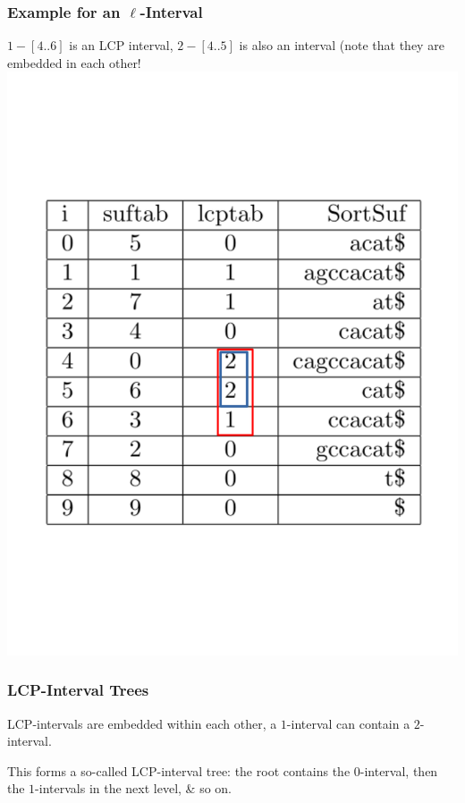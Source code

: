 \documentclass[compress,handout]{beamer} %
\begin{document}
\begin{frame}
	\frametitle{Example for an $\ell$-Interval}
	$1-[4..6]$ is an LCP interval, $2-[4..5]$ is also an interval
	(note that they are embedded in each other!
	\includegraphics[width=\textwidth, height=\textheight, keepaspectratio=true]{esa_example_highlight_interval}
\end{frame}

\begin{frame}
	\frametitle{LCP-Interval Trees}
	LCP-intervals are embedded within each other, a $1$-interval
	can contain a $2$-interval.

	This forms a so-called LCP-interval tree: the root contains the $0$-interval,
	then the $1$-intervals in the next level, \& so on.
\end{frame}
\end{document}

